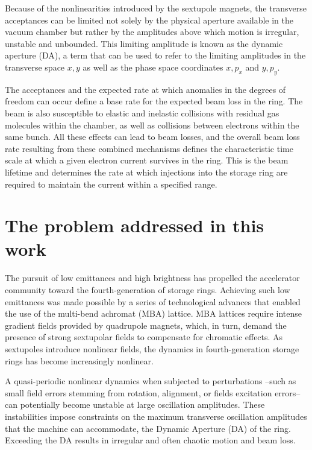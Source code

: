 Because of the nonlinearities introduced by the sextupole magnets, the transverse acceptances can be limited not solely by the physical aperture available in the vacuum chamber but rather by the amplitudes above which motion is irregular, unstable and unbounded. This limiting amplitude is known as the dynamic aperture (DA), a term that can be used to refer to the limiting amplitudes in the transverse space $x,y$ as well as the phase space coordinates $x, p_x$ and $y, p_y$.

The acceptances and the expected rate at which anomalies in the degrees of freedom can occur define a base rate for the expected beam loss in the ring. The beam is also susceptible to elastic and inelastic collisions with residual gas molecules within the chamber, as well as collisions between electrons within the same bunch. All these effects can lead to beam losses, and the overall beam loss rate resulting from these combined mechanisms defines the characteristic time scale at which a given electron current survives in the ring. This is the beam lifetime and determines the rate at which injections into the storage ring are required to maintain the current within a specified range.

\section*{The problem addressed in this work}

The pursuit of low emittances and high brightness has propelled the accelerator community toward the fourth-generation of storage rings. Achieving such low emittances was made possible by a series of technological advances that enabled the use of the multi-bend achromat (MBA) lattice\cite{liu_towards_2017,hettel_challenges_2014}. MBA lattices require intense gradient fields provided by quadrupole magnets, which, in turn, demand the presence of strong sextupolar fields to compensate for chromatic effects. As sextupoles introduce nonlinear fields, the dynamics in fourth-generation storage rings has become increasingly nonlinear\cite{liu_towards_2017}.

A quasi-periodic nonlinear dynamics when subjected to perturbations --such as small field errors stemming from rotation, alignment, or fields excitation errors-- can potentially become unstable at large oscillation amplitudes. These instabilities impose constraints on the maximum transverse oscillation amplitudes that the machine can accommodate, the Dynamic Aperture (DA) of the ring. Exceeding the DA results in irregular and often chaotic motion and beam loss.

